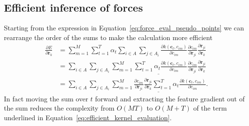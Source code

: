 \subsection{Efficient inference of forces}
Starting from the expression in Equation~\eqref{eq:force_eval_pseudo_points} we can rearrange the order of the sums to make the calculation more efficient
\begin{subequations}
  \label{eq:efficient_kernel_evaluation}
\begin{align}
  \frac{\partial E}{\partial \mathbf{r}_k} &= \sum_{m=1}^M\sum_{t=1}^T \alpha_t \sum_{i\in A}\sum_{j\in A_i} \frac{\partial k(\mathbf{c}_{t}, c_{im})}{\partial c_{im}} \frac{\partial c_{im}}{\partial\mathbf{r}_{ji}} \frac{\partial\mathbf{r}_{ji}}{\partial\mathbf{r}_k}\\
  &= \sum_{i\in A}\sum_{j\in A_i} \underline{\sum_{m=1}^M\sum_{t=1}^T \alpha_t \frac{\partial k(\mathbf{c}_{t}, c_{im})}{\partial c_{im}} \frac{\partial c_{im}}{\partial\mathbf{r}_{ji}} \frac{\partial\mathbf{r}_{ji}}{\partial\mathbf{r}_k}}\\
  &= \sum_{i\in A}\sum_{j\in A_i}\underline{\sum_{m=1}^M\frac{\partial c_{im}}{\partial\mathbf{r}_{ji}} \frac{\partial\mathbf{r}_{ji}}{\partial\mathbf{r}_k} \sum_{t=1}^T \alpha_t \frac{\partial k(\mathbf{c}_{t}, c_{im})}{\partial c_{im}}}.
\end{align}
\end{subequations}
In fact moving the sum over $t$ forward and extracting the feature gradient out of the sum reduces the complexity from $O(MT)$ to $O(M+T)$ of the term underlined in Equation~\eqref{eq:efficient_kernel_evaluation}.

